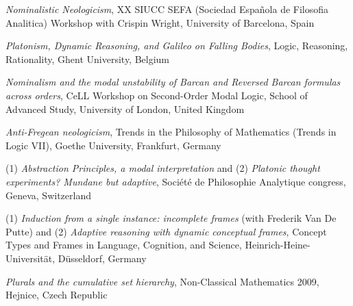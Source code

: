 \documentclass[10pt, a4paper]{article}
\newcommand{\years}[1]{\marginnote{\normalsize #1}}
\begin{document}
\vspace{0.5mm}


 \emph{Nominalistic Neologicism},  XX SIUCC SEFA (Sociedad Espa\~ nola de Filosofia Analitica) Workshop with Crispin Wright,    University of  Barcelona, Spain


\vspace{0.5mm}



\years{2010} \emph{Platonism,   Dynamic   Reasoning,   and   Galileo   on   Falling   Bodies}, Logic,   Reasoning,   Rationality,  Ghent   University,
Belgium



\vspace{0.5mm}




  \emph{Nominalism and the modal unstability of Barcan and Reversed Barcan formulas across orders},     CeLL Workshop on Second-Order Modal Logic,  School of Advanced Study, University of London, United Kingdom

\vspace{0.5mm}



  \years{2009} \emph{Anti-Fregean neologicism}, Trends in the Philosophy of Mathematics (Trends in Logic VII),     Goethe University, Frankfurt, Germany


\vspace{0.5mm}


  (1) \emph{Abstraction Principles, a modal interpretation} and (2)   \emph{Platonic  thought   experiments?  Mundane   but  adaptive}, Soci\'et\'e de Philosophie Analytique  congress,
    Geneva, Switzerland


\vspace{0.5mm}



(1)  \emph{Induction from a single instance: incomplete frames} (with Frederik Van De Putte) and (2)   \emph{Adaptive reasoning with dynamic conceptual frames},
  Concept Types and Frames in Language, Cognition, and Science,      Heinrich-Heine-Universit\" at, D\"usseldorf, Germany


\vspace{0.5mm}




 \emph{Plurals and the cumulative set hierarchy},   Non-Classical Mathematics 2009,    Hejnice, Czech Republic


\vspace{0.5mm}
\end{document}
